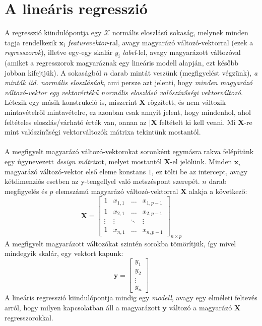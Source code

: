 \documentclass[14p]{report}
\def\pmb{\boldsymbol}
\begin{document}
	\section{A lineáris regresszió}
	A regresszió kiindulópontja egy $\mathscr{X}$ normális eloszlású sokaság, melynek minden tagja rendelkezik $\pmb{x}_i$ \emph{featurevektor}-ral, avagy magyarázó változó-vektorral (ezek a \emph{regresszorok}), illetve egy-egy skalár $y_i$ \emph{label}-lel, avagy magyarázott változóval (amiket a regresszorok magyaráznak egy lineáris modell alapján, ezt később jobban kifejtjük). A sokaságból $n$ darab mintát veszünk (megfigyelést végzünk), \emph{a minták iid. normális eloszlásúak}, ami persze azt jelenti, hogy \emph{minden magyarázó változó-vektor egy vektorértékű normális eloszlású valószínűségi vektorváltozó}. Létezik egy másik konstrukció is, miszerint $\pmb{X}$ rögzített, és nem változik mintavételről mintavételre, ez azonban csak annyit jelent, hogy mindenhol, ahol feltételes eloszlás/várható érték van, onnan az $\mid \pmb{X}$ feltételt ki kell venni. Mi $\pmb{X}$-re mint valószínűségi vektorváltozók mátrixa tekintünk mostantól.
	\\
	\\
	A megfigyelt magyarázó változó-vektorokat soronként egymásra rakva felépítünk egy úgynevezett \emph{design mátrix}ot, melyet mostantól $\pmb{X}$-el jelölünk. Minden $\pmb{x}_i$ magyarázó változó-vektor első eleme konstans $1$, ez tölti be az intercept, avagy kétdimenziós esetben az y-tengellyel való metszéspont szerepét. $n$ darab megfigyelés és $p$ elemszámú magyarázó változó-vektorral $\pmb{X}$ alakja a következő:
	\[
	\pmb{X} = 
	\begin{bmatrix}
		1 & x_{1,1} & \dots & x_{1,p-1} \\
		1 & x_{2,1} & \dots & x_{2,p-1} \\
		\vdots & \vdots & \ddots & \vdots \\
		1 & x_{n,1} & \dots & x_{n,p-1}	
	\end{bmatrix}_{n \times p}
	\]
	A megfigyelt magyarázott változókat szintén sorokba tömörítjük, így mivel mindegyik skalár, egy vektort kapunk:
	\[
	\pmb{y} =
	\begin{bmatrix}
		y_1 \\
		y_2 \\
		\vdots \\
		y_n
	\end{bmatrix}
	\]
	A lineáris regresszió kiindulópontja mindig egy \emph{modell}, avagy egy elméleti feltevés arról, hogy milyen kapcsolatban áll a magyarázott $\pmb{y}$ változó a magyarázó $\pmb{X}$ regresszorokkal.
\end{document}
